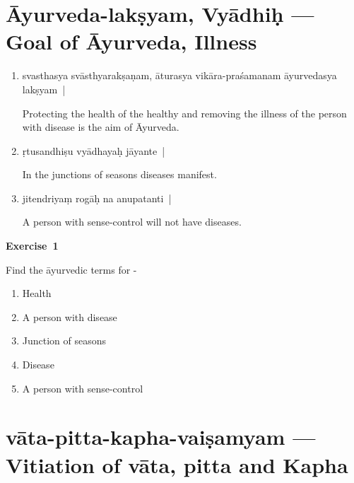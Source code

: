 \chapter{Āyurveda-lakṣyam, Vyādhiḥ --- Goal of Āyurveda, Illness}

\begin{enumerate}
\itemsep=0pt
\item {}

svasthasya svāsthyarakṣaṇam, āturasya vikāra-praśamanam āyurvedasya lakṣyam~|             

Protecting the health of the healthy and removing the illness of the person with disease is the aim of Āyurveda.

\item {}

ṛtusandhiṣu vyādhayaḥ jāyante~|

In the junctions of seasons diseases manifest.

\item {}

jitendriyaṃ rogāḥ na anupatanti~|	

A person with sense-control will not have diseases. 
\end{enumerate}

\centerline{\textbf{Exercise~1}}

Find the āyurvedic terms for -
\begin{enumerate}
\itemsep=0pt
\renewcommand{\theenumi}{\alph{enumi}}
\renewcommand{\labelenumi}{\theenumi.}
\item Health 
\item A person with disease 
\item Junction of seasons 
\item Disease 
\item A person with sense-control 
\end{enumerate}

\chapter{vāta-pitta-kapha-vaiṣamyam --- Vitiation of vāta, pitta and Kapha}

